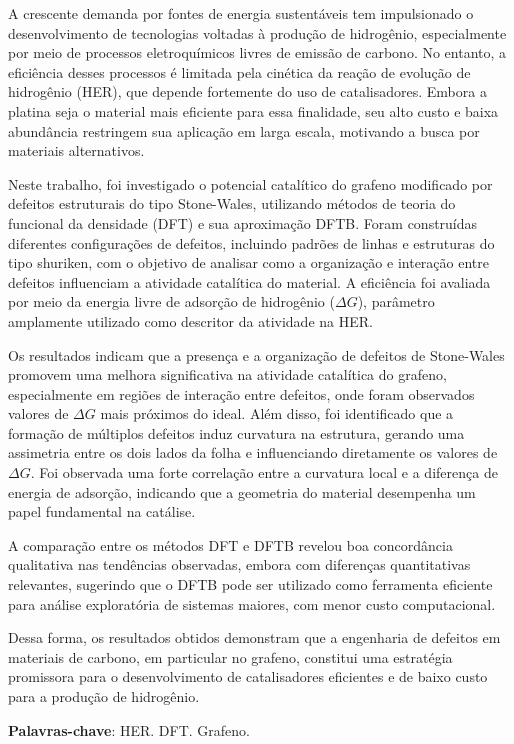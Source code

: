 \documentclass[
  12pt,
  oneside,
  a4paper,
  chapter=TITLE,
  section=TITLE,
  brazil
]{abntex2}
\begin{document}
\begin{resumo}

A crescente demanda por fontes de energia sustentáveis tem impulsionado o desenvolvimento de tecnologias voltadas à produção de hidrogênio, especialmente por meio de processos eletroquímicos livres de emissão de carbono. No entanto, a eficiência desses processos é limitada pela cinética da reação de evolução de hidrogênio (HER), que depende fortemente do uso de catalisadores. Embora a platina seja o material mais eficiente para essa finalidade, seu alto custo e baixa abundância restringem sua aplicação em larga escala, motivando a busca por materiais alternativos.

Neste trabalho, foi investigado o potencial catalítico do grafeno modificado por defeitos estruturais do tipo Stone-Wales, utilizando métodos de teoria do funcional da densidade (DFT) e sua aproximação DFTB. Foram construídas diferentes configurações de defeitos, incluindo padrões de linhas e estruturas do tipo shuriken, com o objetivo de analisar como a organização e interação entre defeitos influenciam a atividade catalítica do material. A eficiência foi avaliada por meio da energia livre de adsorção de hidrogênio ($\Delta G$), parâmetro amplamente utilizado como descritor da atividade na HER.

Os resultados indicam que a presença e a organização de defeitos de Stone-Wales promovem uma melhora significativa na atividade catalítica do grafeno, especialmente em regiões de interação entre defeitos, onde foram observados valores de $\Delta G$ mais próximos do ideal. Além disso, foi identificado que a formação de múltiplos defeitos induz curvatura na estrutura, gerando uma assimetria entre os dois lados da folha e influenciando diretamente os valores de $\Delta G$. Foi observada uma forte correlação entre a curvatura local e a diferença de energia de adsorção, indicando que a geometria do material desempenha um papel fundamental na catálise.

A comparação entre os métodos DFT e DFTB revelou boa concordância qualitativa nas tendências observadas, embora com diferenças quantitativas relevantes, sugerindo que o DFTB pode ser utilizado como ferramenta eficiente para análise exploratória de sistemas maiores, com menor custo computacional.

Dessa forma, os resultados obtidos demonstram que a engenharia de defeitos em materiais de carbono, em particular no grafeno, constitui uma estratégia promissora para o desenvolvimento de catalisadores eficientes e de baixo custo para a produção de hidrogênio.

\textbf{Palavras-chave}: HER. DFT. Grafeno.
\end{resumo}
\end{document}
